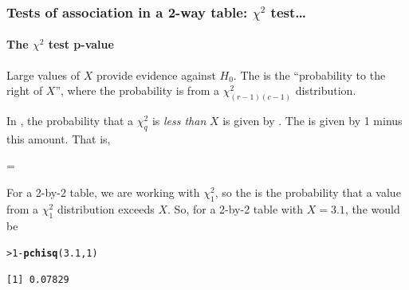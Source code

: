 \documentclass{beamer}\usepackage[]{graphicx}\usepackage[]{xcolor}
\makeatletter
\newcommand{\hlnum}[1]{\textcolor[rgb]{0.686,0.059,0.569}{#1}}%
\newcommand{\hlopt}[1]{\textcolor[rgb]{0,0,0}{#1}}%
\newcommand{\hlstd}[1]{\textcolor[rgb]{0.345,0.345,0.345}{#1}}%
\newcommand{\hlkwd}[1]{\textcolor[rgb]{0.737,0.353,0.396}{\textbf{#1}}}%
\newenvironment{kframe}{%
 \def\at@end@of@kframe{}%
 \ifinner\ifhmode%
  \def\at@end@of@kframe{\end{minipage}}%
  \begin{minipage}{\columnwidth}%
 \fi\fi%
 \def\FrameCommand##1{\hskip\@totalleftmargin \hskip-\fboxsep
 \colorbox{shadecolor}{##1}\hskip-\fboxsep
     \hskip-\linewidth \hskip-\@totalleftmargin \hskip\columnwidth}%
 \MakeFramed {\advance\hsize-\width
   \@totalleftmargin\z@ \linewidth\hsize
   \@setminipage}}%
 {\par\unskip\endMakeFramed%
 \at@end@of@kframe}
\newenvironment{knitrout}{}{} %
\makeatother
\begin{document}
 
\begin{frame}[fragile]
\frametitle{Tests of association in a 2-way table: $\chi^2$ test\ldots}
\framesubtitle{The $\chi^2$ test p-value}

Large values of $X$ provide evidence against $H_0$. The \pval{} is the ``probability to the right of $X$'', where the probability is from a $\chi_{(r-1)(c-1)}^2$ distribution.

\bigskip

In , the probability that a $\chi_q^2$ is {\em less than} $X$ is given by . The \pval{} is given by 1 minus this amount. That is,

\begin{center} \pval{} =  \end{center}

\bigskip

For a 2-by-2 table, we are working with $\chi_1^2$, so the \pval{} is the probability that a value from a $\chi_1^2$ distribution exceeds $X$. So, for a 2-by-2 table with $X=3.1$, the \pval{} would be

\begin{knitrout}\scriptsize
{}\color{fgcolor}\begin{kframe}
\begin{alltt}
\hlstd{> }\hlnum{1}\hlopt{-}\hlkwd{pchisq}\hlstd{(}\hlnum{3.1}\hlstd{,}\hlnum{1}\hlstd{)}
\end{alltt}
\begin{verbatim}
[1] 0.07829
\end{verbatim}
\end{kframe}
\end{knitrout}

\end{frame}

% 
% 
%
\end{document}
